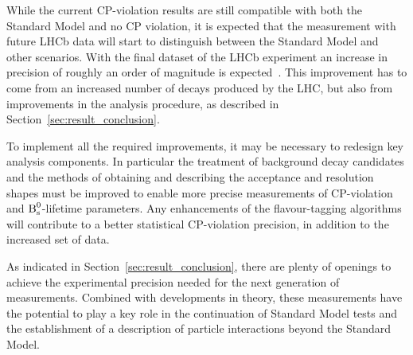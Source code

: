 While the current CP-violation results are still compatible with both the Standard Model and no CP violation, it is expected that the
measurement with future LHCb data will start to distinguish between the Standard Model and other scenarios. With the final dataset of the
LHCb experiment an increase in precision of roughly an order of magnitude is expected~\cite{CERN-LHCC-2011-001,LHCB-PAPER-2012-031}. This
improvement has to come from an increased number of decays produced by the LHC, but also from improvements in the analysis procedure, as
described in Section~\ref{sec:result_conclusion}.

To implement all the required improvements, it may be necessary to redesign key analysis components. In particular the treatment of
background decay candidates and the methods of obtaining and describing the acceptance and resolution shapes must be improved to enable
more precise measurements of CP-violation and $\text{B}_\text{s}^\text{0}$-lifetime parameters. Any enhancements of the flavour-tagging algorithms will contribute
to a better statistical CP-violation precision, in addition to the increased set of \BstoJpsiKK{} data.

As indicated in Section~\ref{sec:result_conclusion}, there are plenty of openings to achieve the experimental precision needed for the next
generation of \BstoJpsiKK{} measurements. Combined with developments in theory, these measurements have the potential to play a key role in
the continuation of Standard Model tests and the establishment of a description of particle interactions beyond the Standard Model.

